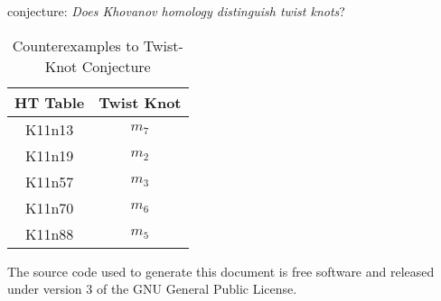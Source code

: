 \documentclass{article}
\theoremstyle{plain}
\begin{document}
        conjecture: \textit{Does Khovanov homology distinguish twist knots}?
        \begin{table}
            \centering
            \begin{tabular}{c | c}
                HT Table&Twist Knot\\
                \hline
                K11n13&$m_{7}$\\
                K11n19&$m_{2}$\\
                K11n57&$m_{3}$\\
                K11n70&$m_{6}$\\
                K11n88&$m_{5}$
            \end{tabular}
            \caption{Counterexamples to Twist-Knot Conjecture}
            \label{tab:counterexamples_twist_knot_conjecture}
        \end{table}
    \newpage
    
    
    \newpage
    The source code used to generate this document is free software and released
    under version 3 of the GNU General Public License.
\end{document}
